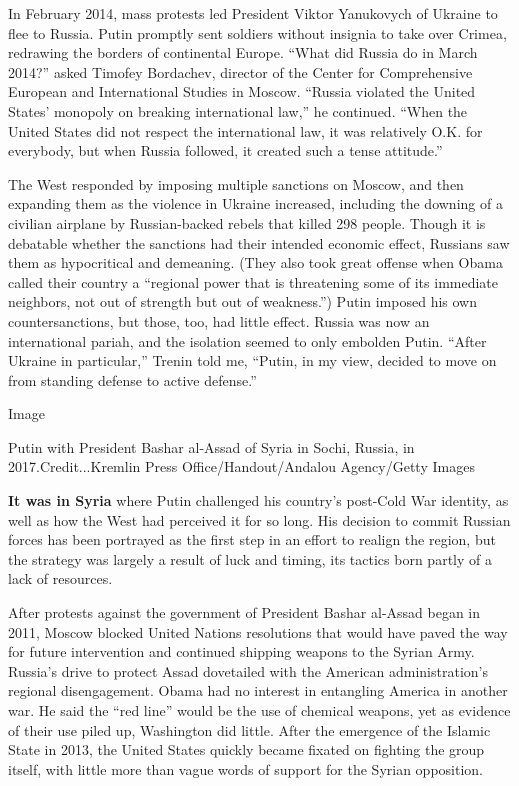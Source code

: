 In February 2014, mass protests led President Viktor Yanukovych of
Ukraine to flee to Russia. Putin promptly sent soldiers without insignia
to take over Crimea, redrawing the borders of continental Europe. ``What
did Russia do in March 2014?'' asked Timofey Bordachev, director of the
Center for Comprehensive European and International Studies in Moscow.
``Russia violated the United States' monopoly on breaking international
law,'' he continued. ``When the United States did not respect the
international law, it was relatively O.K. for everybody, but when Russia
followed, it created such a tense attitude.''

The West responded by imposing multiple sanctions on Moscow, and then
expanding them as the violence in Ukraine increased, including the
downing of a civilian airplane by Russian-backed rebels that killed 298
people. Though it is debatable whether the sanctions had their intended
economic effect, Russians saw them as hypocritical and demeaning. (They
also took great offense when Obama called their country a ``regional
power that is threatening some of its immediate neighbors, not out of
strength but out of weakness.'') Putin imposed his own countersanctions,
but those, too, had little effect. Russia was now an international
pariah, and the isolation seemed to only embolden Putin. ``After Ukraine
in particular,'' Trenin told me, ``Putin, in my view, decided to move on
from standing defense to active defense.''

Image

Putin with President Bashar al-Assad of Syria in Sochi, Russia, in
2017.Credit...Kremlin Press Office/Handout/Andalou Agency/Getty Images

\textbf{It was in Syria} where Putin challenged his country's post-Cold
War identity, as well as how the West had perceived it for so long. His
decision to commit Russian forces has been portrayed as the first step
in an effort to realign the region, but the strategy was largely a
result of luck and timing, its tactics born partly of a lack of
resources.

After protests against the government of President Bashar al-Assad began
in 2011, Moscow blocked United Nations resolutions that would have paved
the way for future intervention and continued shipping weapons to the
Syrian Army. Russia's drive to protect Assad dovetailed with the
American administration's regional disengagement. Obama had no interest
in entangling America in another war. He said the ``red line'' would be
the use of chemical weapons, yet as evidence of their use piled up,
Washington did little. After the emergence of the Islamic State in 2013,
the United States quickly became fixated on fighting the group itself,
with little more than vague words of support for the Syrian opposition.

